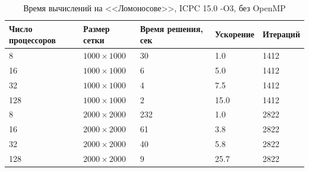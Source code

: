 \documentclass[12pt,notitlepage,oneside]{extarticle}
\begin{document}
\begin{table}[h]
\centering
\caption{Время вычислений на <<Ломоносове>>, ICPC 15.0 -O3, без OpenMP}
\label{lom:table}
\begin{tabular}{|l|l|l|l|l|}
\textbf{Число процессоров} & \textbf{Размер сетки} & \textbf{Время решения, сек} & \textbf{Ускорение} & \textbf{Итераций}      \\  \hline
8                          & $1000 \times 1000 $        & 30                            & 1.0                   & 1412                   \\
16                         & $1000 \times 1000 $        & 6                          & 5.0                   & 1412                   \\
32                         & $1000 \times 1000 $        & 4                         &  7.5                  & 1412                   \\
128                        & $1000 \times 1000 $        & 2                           & 15.0                   & 1412                   \\ \hline
8                          & $2000 \times 2000 $        & 232                            & 1.0                    & 2822                   \\
16                         & $2000 \times 2000 $        & 61                         & 3.8                   & 2822                   \\
32                         & $2000 \times 2000 $        & 40                         & 5.8                   & 2822                   \\
128                        & $2000 \times 2000 $        & 9                           & 25.7                   & 2822
\end{tabular}
\end{table}
\end{document}
